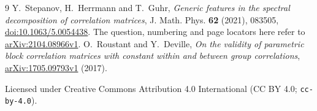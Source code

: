 \documentclass[11pt]{article}
\begin{document}
\begin{thebibliography}{9}
Y.~Stepanov, H.~Herrmann and T.~Guhr,
\emph{Generic features in the spectral decomposition of correlation matrices},
J. Math. Phys. \textbf{62} (2021), 083505,
\href{https://doi.org/10.1063/5.0054438}{doi:10.1063/5.0054438}.
The question, numbering and page locators here refer to
\href{https://arxiv.org/abs/2104.08966v1}{arXiv:2104.08966v1}.
O.~Roustant and Y.~Deville,
\emph{On the validity of parametric block correlation matrices with constant
within and between group correlations},
\href{https://arxiv.org/abs/1705.09793v1}{arXiv:1705.09793v1} (2017).
\end{thebibliography}
\noindent\small Licensed under Creative Commons Attribution 4.0 International
(CC BY 4.0; \texttt{cc-by-4.0}).
\end{document}
